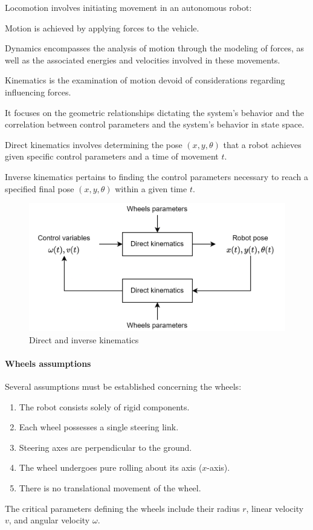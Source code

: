 \begin{definition}
    Locomotion involves initiating movement in an autonomous robot:
\end{definition}
Motion is achieved by applying forces to the vehicle.
\begin{definition}
    Dynamics encompasses the analysis of motion through the modeling of forces, as well as the associated energies and velocities involved in these movements.
\end{definition} 
\begin{definition}
    Kinematics is the examination of motion devoid of considerations regarding influencing forces. 
\end{definition}
It focuses on the geometric relationships dictating the system's behavior and the correlation between control parameters and the system's behavior in state space.

\begin{definition}
    Direct kinematics involves determining the pose $(x, y, \theta)$ that a robot achieves given specific control parameters and a time of movement $t$.
\end{definition}
\begin{definition}
    Inverse kinematics pertains to finding the control parameters necessary to reach a specified final pose $(x, y, \theta)$ within a given time $t$.
\end{definition}
\begin{figure}[H]
    \centering
    \includegraphics[width=0.75\linewidth]{images/kin.png} 
    \caption{Direct and inverse kinematics}
\end{figure}

\paragraph*{Wheels assumptions}
Several assumptions must be established concerning the wheels:
\begin{enumerate}
    \item The robot consists solely of rigid components.
    \item Each wheel possesses a single steering link.
    \item Steering axes are perpendicular to the ground.
    \item The wheel undergoes pure rolling about its axis ($x$-axis).
    \item There is no translational movement of the wheel.
\end{enumerate}
The critical parameters defining the wheels include their radius $r$, linear velocity $v$, and angular velocity $\omega$.

